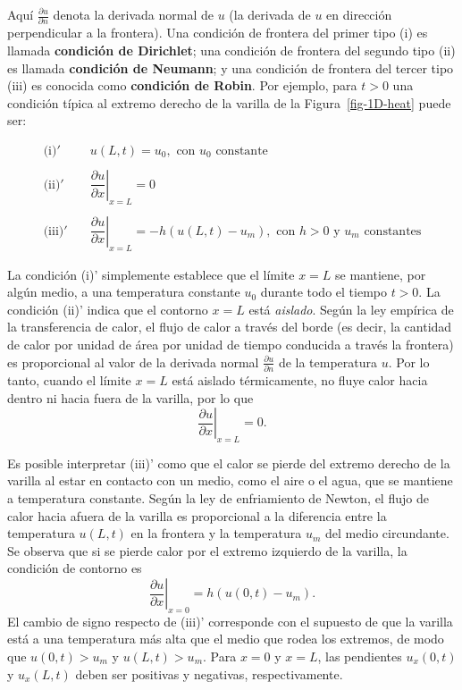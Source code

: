 \documentclass[
  spanish,
  us-letterpaper,
]{scrreprt}
\theoremstyle{definition}
\theoremstyle{plain}
\theoremstyle{remark}
\begin{document}
Aquí \(\frac{\partial u}{\partial n}\) denota la derivada normal de
\(u\) (la derivada de \(u\) en dirección perpendicular a la frontera).
Una condición de frontera del primer tipo (i) es llamada
\textbf{condición de Dirichlet}; una condición de frontera del segundo
tipo (ii) es llamada \textbf{condición de Neumann}; y una condición de
frontera del tercer tipo (iii) es conocida como \textbf{condición de
Robin}. Por ejemplo, para \(t>0\) una condición típica al extremo
derecho de la varilla de la Figura~\ref{fig-1D-heat} puede ser:

\begin{align*}
  \text{(i)}'   &\quad u(L,t) = u_0, \text{  con } u_0 \text{ constante} \\ \\
  \text{(ii)}'  &\quad \left. \dfrac{\partial u}{\partial x} \right|_{x=L} = 0 \\ \\
  \text{(iii)}' &\quad \left. \dfrac{\partial u}{\partial x} \right|_{x=L} = -h(u(L,t)-u_m),\text{  con } h>0 \text{ y } u_m \text{ constantes}
\end{align*}

La condición (i)' simplemente establece que el límite \(x=L\) se
mantiene, por algún medio, a una temperatura constante \(u_0\) durante
todo el tiempo \(t>0\). La condición (ii)' indica que el contorno
\(x=L\) está \emph{aislado}. Según la ley empírica de la transferencia
de calor, el flujo de calor a través del borde (es decir, la cantidad de
calor por unidad de área por unidad de tiempo conducida a través la
frontera) es proporcional al valor de la derivada normal
\(\frac{\partial u}{\partial n}\) de la temperatura \(u\). Por lo tanto,
cuando el límite \(x=L\) está aislado térmicamente, no fluye calor hacia
dentro ni hacia fuera de la varilla, por lo que \[
\left. \dfrac{\partial u}{\partial x} \right|_{x=L} = 0.
\]

Es posible interpretar (iii)' como que el calor se pierde del extremo
derecho de la varilla al estar en contacto con un medio, como el aire o
el agua, que se mantiene a temperatura constante. Según la ley de
enfriamiento de Newton, el flujo de calor hacia afuera de la varilla es
proporcional a la diferencia entre la temperatura \(u(L, t)\) en la
frontera y la temperatura \(u_m\) del medio circundante. Se observa que
si se pierde calor por el extremo izquierdo de la varilla, la condición
de contorno es \[
\left. \dfrac{\partial u}{\partial x} \right|_{x=0} = h(u(0,t)-u_m).
\] El cambio de signo respecto de (iii)' corresponde con el supuesto de
que la varilla está a una temperatura más alta que el medio que rodea
los extremos, de modo que \(u(0, t) > u_m\) y \(u(L, t) > u_m\). Para
\(x=0\) y \(x=L\), las pendientes \(u_x(0, t)\) y \(u_x(L, t)\) deben
ser positivas y negativas, respectivamente.
\end{document}
